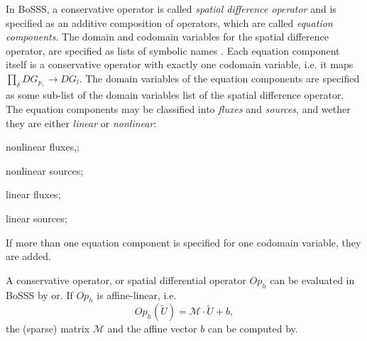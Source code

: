 \begin{myRem}
In BoSSS, a conservative operator is called
\emph{spatial difference operator}
and is specified as an additive composition of operators, which are called
\emph{equation components}.
The domain and codomain variables for the  spatial difference operator, are specified as lists
of symbolic names .
Each equation component itself is a conservative operator with exactly one codomain variable,
i.e. it maps $\prod_\delta DG_{p_\gamma} \rightarrow DG_l$.
The domain variables of the equation components are specified as some
sub-list
of the domain variables list of the spatial difference operator.
The equation components may be classified into \emph{fluxes} and \emph{sources},
and wether they are either \emph{linear} or \emph{nonlinear}:
\begin{packed_itemize}
  \item nonlinear fluxes,;
  \item nonlinear sources;
  \item linear fluxes;
  \item linear sources;
\end{packed_itemize}
If more than one equation component is specified for one codomain variable, they are
added.
\end{myRem}

\begin{myRem}
A conservative operator, or spatial differential operator $Op_h$ can be evaluated
in BoSSS
by
or.
If $Op_h$ is affine-linear, i.e.
\[
  Op_h(\tilde{U}) = \mathcal{M} \cdot \tilde{U} + b,
\]
the (sparse) matrix $\mathcal{M}$ and the affine vector $b$ can
be computed
by.
\end{myRem}






